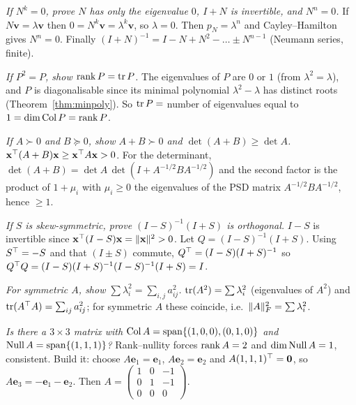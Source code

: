 \begin{example}
\emph{If $N^k=0$, prove $N$ has only the eigenvalue $0$, $I+N$ is invertible, and $N^n=0$.} If $N\mathbf{v}=\lambda\mathbf{v}$ then $0=N^k\mathbf{v}=\lambda^k\mathbf{v}$, so $\lambda=0$. Then $p_N=\lambda^n$ and Cayley--Hamilton gives $N^n=0$. Finally $(I+N)^{-1}=I-N+N^2-\dots\pm N^{n-1}$ (Neumann series, finite).
\end{example}

\begin{example}
\emph{If $P^2=P$, show $\operatorname{rank} P=\operatorname{tr} P$.} The eigenvalues of $P$ are $0$ or $1$ (from $\lambda^2=\lambda$), and $P$ is diagonalisable since its minimal polynomial $\lambda^2-\lambda$ has distinct roots (Theorem~\ref{thm:minpoly}). So $\operatorname{tr} P=$ number of eigenvalues equal to $1=\dim\operatorname{Col} P=\operatorname{rank} P$.
\end{example}

\begin{example}
\emph{If $A\succ0$ and $B\succeq0$, show $A+B\succ0$ and $\det(A+B)\ge\det A$.} $\mathbf{x}^{\top}(A+B)\mathbf{x}\ge\mathbf{x}^{\top} A\mathbf{x}>0$. For the determinant, $\det(A+B)=\det A\,\det(I+A^{-1/2}BA^{-1/2})$ and the second factor is the product of $1+\mu_i$ with $\mu_i\ge0$ the eigenvalues of the PSD matrix $A^{-1/2}BA^{-1/2}$, hence $\ge1$.
\end{example}

\begin{example}
\emph{If $S$ is skew-symmetric, prove $(I-S)^{-1}(I+S)$ is orthogonal.} $I-S$ is invertible since $\mathbf{x}^{\top}(I-S)\mathbf{x}=\lVert\mathbf{x}\rVert^2>0$. Let $Q=(I-S)^{-1}(I+S)$. Using $S^{\top}=-S$ and that $(I\pm S)$ commute, $Q^{\top}=(I-S)(I+S)^{-1}$ so $Q^{\top} Q=(I-S)(I+S)^{-1}(I-S)^{-1}(I+S)=I$.
\end{example}

\begin{example}
\emph{For symmetric $A$, show $\sum\lambda_i^2=\sum_{i,j}a_{ij}^2$.} $\operatorname{tr}(A^2)=\sum\lambda_i^2$ (eigenvalues of $A^2$) and $\operatorname{tr}(A^{\top} A)=\sum_{ij}a_{ij}^2$; for symmetric $A$ these coincide, i.e.\ $\lVert A\rVert_F^2=\sum\lambda_i^2$.
\end{example}

\begin{example}
\emph{Is there a $3\times3$ matrix with $\operatorname{Col} A=\operatorname{span}\{(1,0,0),(0,1,0)\}$ and $\operatorname{Null} A=\operatorname{span}\{(1,1,1)\}$?} Rank--nullity forces $\operatorname{rank} A=2$ and $\dim\operatorname{Null} A=1$, consistent. Build it: choose $A\mathbf{e}_1=\mathbf{e}_1$, $A\mathbf{e}_2=\mathbf{e}_2$ and $A(1,1,1)^{\top}=\mathbf{0}$, so $A\mathbf{e}_3=-\mathbf{e}_1-\mathbf{e}_2$. Then $A=\begin{pmatrix}1&0&-1\\0&1&-1\\0&0&0\end{pmatrix}$.
\end{example}

